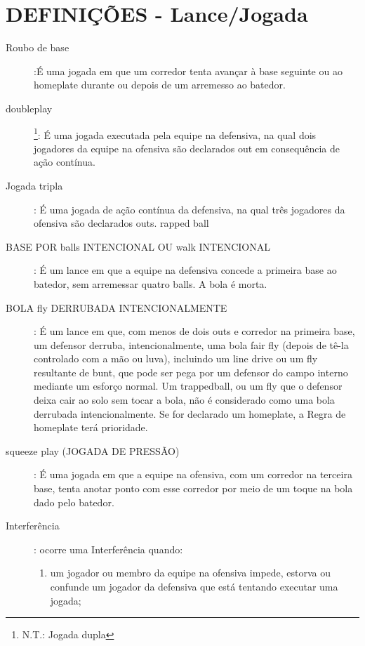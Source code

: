 	\section{DEFINI\c{C}\~OES - Lance/Jogada}
	\begin{description}	
	\item[Roubo de base]:\'E uma jogada em que um corredor tenta avan\c{c}ar \`a base seguinte ou ao \gls{homeplate} durante ou depois de um arremesso ao batedor. 

	\item[\Gls{doubleplay}]\footnote{N.T.: Jogada dupla}: \'E uma jogada executada pela equipe na defensiva, na qual dois jogadores da equipe na ofensiva s\~ao declarados \gls{out} em consequ\^encia de a\c{c}\~ao cont\'inua. 		
	
	\item[Jogada tripla]: \'E uma jogada de a\c{c}\~ao cont\'inua da defensiva, na qual tr\^es jogadores da ofensiva s\~ao declarados \gls{out}s. rapped ball
	\item[BASE POR \glspl{ball} INTENCIONAL OU \gls{walk} INTENCIONAL]:
	\'E um lance em que a equipe na defensiva concede a primeira base ao batedor, sem arremessar quatro \glspl{ball}. A bola \'e morta. 
	
	\item[BOLA \gls{fly} DERRUBADA INTENCIONALMENTE]: \'E um lance em que, com menos de dois \glspl{out} e corredor na primeira base, um defensor derruba, intencionalmente, uma bola \gls{fair fly} (depois de t\^e-la controlado com a m\~ao ou luva), incluindo um \gls{line drive} ou um \gls{fly} resultante de \gls{bunt}, que pode ser pega por um defensor do campo interno mediante um esfor\c{c}o normal. Um \gls{trappedball}, ou um \gls{fly} que o defensor deixa cair ao solo sem tocar a bola, n\~ao \'e considerado como uma bola derrubada intencionalmente. Se for declarado um \gls{homeplate}, a Regra de \gls{homeplate} ter\'a prioridade. 
	
	\item[\gls{squeeze play} (JOGADA DE PRESS\~AO)]: \'E uma jogada em que a equipe na ofensiva, com um corredor na terceira base, tenta anotar ponto com esse corredor por meio de um toque na bola dado pelo batedor. 

	
	\item[Interfer\^encia]:	ocorre uma Interfer\^encia quando: 
	\begin{enumerate}[label=\alph*)]
		\item um jogador ou membro da equipe na ofensiva impede, estorva ou confunde um jogador da defensiva que est\'a tentando executar uma jogada; 
		

\end{enumerate}
\end{description}
